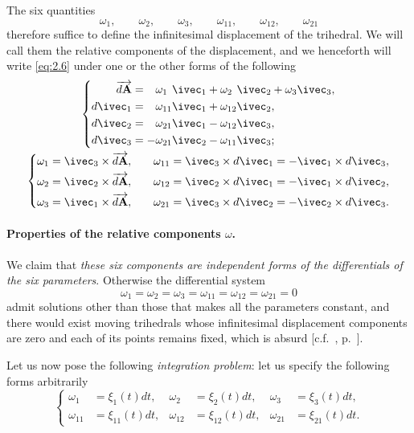 The six quantities
\[
\omega_{1},\qquad\omega_{2},\qquad\omega_{3},\qquad\omega_{11},\qquad\omega_{12},\qquad\omega_{21}
\]
therefore suffice to define the infinitesimal displacement of the trihedral. We will call them the relative components of the displacement, and we henceforth will write \eqref{eq:2.6} under one or the other forms of the following
\begin{gather}
  \label{eq:2.7}
  \left\{
    \begin{aligned}
      \overrightarrow{d\mathbf{A}}&={}\hphantom{+}\omega_{1\hphantom{0}}\ivec_{1}+\omega_{2\hphantom{0}}\ivec_{2}+\omega_{3}\ivec_{3},\\
      d\ivec_{1}&={}\hphantom{+}\omega_{11}\ivec_{1}+\omega_{12}\ivec_{2},\\
      d\ivec_{2}&={}\hphantom{+}\omega_{21}\ivec_{1}-\omega_{12}\ivec_{3},\\
      d\ivec_{3}&=-\omega_{21}\ivec_{2}-\omega_{11}\ivec_{3};
    \end{aligned}
  \right.  \\
  \label{eq:2.8}
  \left\{
    \begin{aligned}
      \omega_{1}&=\ivec_{3}\times\overrightarrow{d\mathbf{A}},&&&\omega_{11}&=\ivec_{3}\times d\ivec_{1}=-\ivec_{1}\times d\ivec_{3},\\
      \omega_{2}&=\ivec_{2}\times\overrightarrow{d\mathbf{A}},&&&\omega_{12}&=\ivec_{2}\times d\ivec_{1}=-\ivec_{1}\times d\ivec_{2},\\
      \omega_{3}&=\ivec_{1}\times\overrightarrow{d\mathbf{A}},&&&\omega_{21}&=\ivec_{3}\times d\ivec_{2}=-\ivec_{2}\times d\ivec_{3}.
    \end{aligned}
  \right.
\end{gather}

\paragraph{Properties of the relative components $\omega$.}
\label{sec:25}
We claim that \emph{these six components are independent forms of the differentials of the six parameters}. Otherwise the differential system
\[
\omega_{1}=\omega_{2}=\omega_{3}=\omega_{11}=\omega_{12}=\omega_{21}=0
\]
admit solutions other than those that makes all the parameters constant, and there would exist moving trihedrals whose infinitesimal displacement components are zero and each of its points remains fixed, which is absurd [c.f.~, p.~\pageref{sec:8}].

Let us now pose the following \emph{integration problem}: let us specify the following forms arbitrarily
\begin{equation}
  \label{eq:2.9}
  \left\{
    \begin{aligned}
      \omega_{1}&=\xi_{1}(t)dt,&\omega_{2}&=\xi_{2}(t)dt,&\omega_{3}&=\xi_{3}(t)dt,\\
      \omega_{11}&=\xi_{11}(t)dt,&\omega_{12}&=\xi_{12}(t)dt,&\omega_{21}&=\xi_{21}(t)dt.
    \end{aligned}
  \right.
\end{equation}

